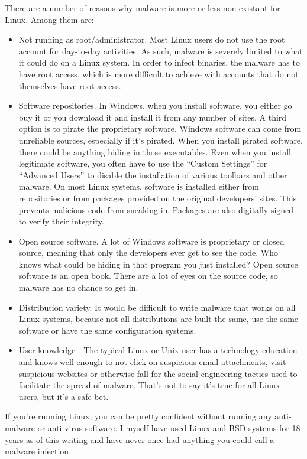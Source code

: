 There are a number of reasons why malware is more or less non-existant for Linux.  Among them are:

\begin{itemize}
\item Not running as root/administrator.  Most Linux users do not use the root account for day-to-day activities.  As such, malware is severely limited to what it could do on a Linux system.  In order to infect binaries, the malware has to have root access, which is more difficult to achieve with accounts that do not themselves have root access.
\item Software repositories.  In Windows, when you install software, you either go buy it or you download it and install it from any number of sites.  A third option is to pirate the proprietary software.  Windows software can come from unreliable sources, especially if it's pirated.  When you install pirated software, there could be anything hiding in those executables.  Even when you install legitimate software, you often have to use the ``Custom Settings'' for ``Advanced Users'' to disable the installation of various toolbars and other malware.  On most Linux systems, software is installed either from repositories or from packages provided on the original developers' sites.  This prevents malicious code from sneaking in.  Packages are also digitally signed to verify their integrity.
\item Open source software.  A lot of Windows software is proprietary or closed source, meaning that only the developers ever get to see the code.  Who knows what could be hiding in that program you just installed?  Open source software is an open book.  There are a lot of eyes on the source code, so malware has no chance to get in.
\item Distribution variety.  It would be difficult to write malware that works on all Linux systems, because not all distributions are built the same, use the same software or have the same configuration systems.
\item User knowledge - The typical Linux or Unix user has a technology education and knows well enough to not click on suspicious email attachments, visit suspicious websites or otherwise fall for the social engineering tactics used to facilitate the spread of malware.  That's not to say it's true for all Linux users, but it's a safe bet.
\end{itemize}

If you're running Linux, you can be pretty confident without running any anti-malware or anti-virus software.  I myself have used Linux and BSD systems for 18 years as of this writing and have never once had anything you could call a malware infection.


